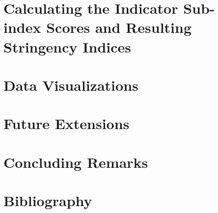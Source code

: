 \documentclass[11pt, a4paper, leqno]{article}
\begin{document}



\section{Calculating the Indicator Sub-index Scores and Resulting Stringency Indices} %
\label{sec:section2}




\section{Data Visualizations} %
\label{sec:section3}




\section{Future Extensions} %
\label{sec:section4}

%


\section*{Concluding Remarks} %
\label{sec:conclusion}

%


\clearpage

\section*{Bibliography} %
\label{sec:bibliography}


\printbibliography
{}





\end{document}
